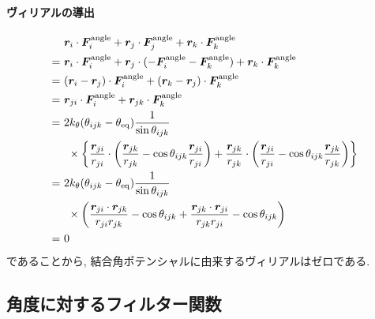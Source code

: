 \paragraph{ヴィリアルの導出}
\begin{align}
 &~  \bm{r}_{i} \cdot \bm{F}_{i}^{\mathrm{angle}}
   + \bm{r}_{j} \cdot \bm{F}_{j}^{\mathrm{angle}}
   + \bm{r}_{k} \cdot \bm{F}_{k}^{\mathrm{angle}}
 \notag \\
 =&~
     \bm{r}_{i} \cdot \bm{F}_{i}^{\mathrm{angle}}
   + \bm{r}_{j} \cdot (-\bm{F}_{i}^{\mathrm{angle}} -\bm{F}_{k}^{\mathrm{angle}})
   + \bm{r}_{k} \cdot \bm{F}_{k}^{\mathrm{angle}}
 \notag \\
 =&~
     (\bm{r}_{i} - \bm{r}_{j}) \cdot \bm{F}_{i}^{\mathrm{angle}}
   + (\bm{r}_{k} - \bm{r}_{j}) \cdot \bm{F}_{k}^{\mathrm{angle}}
 \notag \\
 =&~
     \bm{r}_{ji} \cdot \bm{F}_{i}^{\mathrm{angle}}
   + \bm{r}_{jk} \cdot \bm{F}_{k}^{\mathrm{angle}}
 \notag \\
 =&~
   2k_{\theta} (\theta_{ijk} - \theta_{\mathrm{eq}}) \frac{1}{\sin \theta_{ijk}}
 \notag \\
 &~~\times
   \left\{
           \frac{\bm{r}_{ji}}{r_{ji}} \cdot 
           \left(
                  \frac{\bm{r}_{jk}}{r_{jk}} - \cos\theta_{ijk} \frac{\bm{r}_{ji}}{r_{ji}}
           \right)
          +\frac{\bm{r}_{jk}}{r_{jk}} \cdot 
           \left(
                 \frac{\bm{r}_{ji}}{r_{ji}} - \cos\theta_{ijk} \frac{\bm{r}_{jk}}{r_{jk}}
           \right)
  \right\}
 \notag \\
 =&~
   2k_{\theta} (\theta_{ijk} - \theta_{\mathrm{eq}}) \frac{1}{\sin \theta_{ijk}}
 \notag \\
 &~~\times
   \left(
          \frac{\bm{r}_{ji} \cdot \bm{r}_{jk}}{r_{ji} r_{jk}} - \cos \theta_{ijk}
         +\frac{\bm{r}_{jk} \cdot \bm{r}_{ji}}{r_{jk} r_{ji}} - \cos \theta_{ijk}
   \right)
 \notag \\
 =&~
   0
 \notag 
\end{align}
であることから, 結合角ポテンシャルに由来するヴィリアルはゼロである. 
\clearpage

\subsection{角度に対するフィルター関数}
